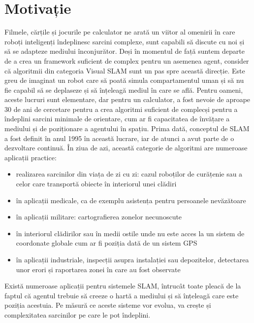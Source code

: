 \documentclass[12pt,a4paper]{report}
\begin{document}
\section{Motivație}
Filmele, cărțile și jocurile pe calculator ne arată un viitor al omenirii în care
roboți inteligenți îndeplinesc sarcini complexe, sunt capabili să discute cu noi și 
să se adapteze mediului înconjurător. Deși în momentul de față suntem departe de a
crea un framework suficient de complex pentru un asemenea agent, consider că algoritmii din categoria 
Visual SLAM sunt un pas spre această direcție. Este greu de imaginat un robot care
să poată simula compartamentul uman și să nu fie capabil să se deplaseze și să înțeleagă mediul
în care se află. Pentru oameni, aceste lucruri sunt elementare, dar pentru
un calculator, a fost nevoie de aproape 30 de ani de cercetare pentru a crea algoritmi 
suficient de complecși pentru a îndeplini sarcini minimale de orientare, cum ar fi 
capacitatea de învățare a mediului și de poziționare a agentului în spațiu. Prima
dată, conceptul de SLAM a fost definit în anul 1995 în această lucrare\cite{durrant1996slam}, 
iar de atunci a avut parte de o dezvoltare continuă. În ziua de azi, această categorie 
de algoritmi are numeroase aplicații practice: 
\begin{itemize}
    \item realizarea sarcinilor din viața de zi cu zi: cazul roboților de curățenie
sau a celor care transportă obiecte în interiorul unei clădiri 
    \item în aplicații medicale, ca de exemplu asistența pentru persoanele nevăzătoare
    \item în aplicații militare: cartografierea zonelor necunoscute
    \item în interiorul clădirilor sau în medii ostile unde nu este acces la un sistem de coordonate globale
cum ar fi poziția dată de un sistem GPS  
    \item în aplicații industriale, inspecții asupra instalației sau depozitelor, 
detectarea unor erori și raportarea zonei în care au fost observate    
\end{itemize}
Există numeroase aplicații pentru sistemele SLAM, întrucât toate pleacă de la faptul 
că agentul trebuie să creeze o hartă a mediului și să înțeleagă care este poziția acestuia.
Pe măsură ce aceste sisteme vor evolua, va crește și complexitatea sarcinilor pe 
care le pot îndeplini.   
\end{document}
